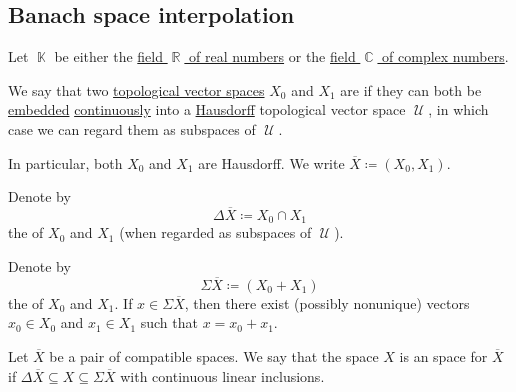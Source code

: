 \subsection{Banach space interpolation}\label{subsec:banach_space_interpolation}

\begin{definition}\label{def:interpolated_topological_vector_space}
  Let \( \BbbK \) be either the \hyperref[def:real_numbers]{field \( \BbbR \) of real numbers} or the \hyperref[def:real_numbers]{field \( \BbbC \) of complex numbers}.

  \begin{thmenum}
     We say that two \hyperref[def:topological_vector_space]{topological vector spaces} \( X_0 \) and \( X_1 \) are  if they can both be \hyperref[def:morphism_invertibility/left_cancellative]{embedded} \hyperref[def:global_continuity]{continuously} into a \hyperref[def:separation_axioms/T2]{Hausdorff} topological vector space \( \mscrU \), in which case we can regard them as subspaces of \( \mscrU \).

    In particular, both \( X_0 \) and \( X_1 \) are Hausdorff. We write \( \overline{X} \coloneqq (X_0, X_1) \).

     Denote by
    \begin{equation*}
      \Delta \overline{X} \coloneqq X_0 \cap X_1
    \end{equation*}
    the  of \( X_0 \) and \( X_1 \) (when regarded as subspaces of \( \mscrU \)).

     Denote by
    \begin{equation*}
      \Sigma \overline{X} \coloneqq ( X_0 + X_1 )
    \end{equation*}
    the  of \( X_0 \) and \( X_1 \). If \( x \in \Sigma \overline{X} \), then there exist (possibly nonunique) vectors \( x_0 \in X_0 \) and \( x_1 \in X_1 \) such that \( x = x_0 + x_1 \).

     Let \( \overline{X} \) be a pair of compatible spaces. We say that the space \( X \) is an  space for \( \overline{X} \) if \( \Delta \overline{X} \subseteq X \subseteq \Sigma \overline{X} \) with continuous linear inclusions.


\end{thmenum}
\end{definition}
